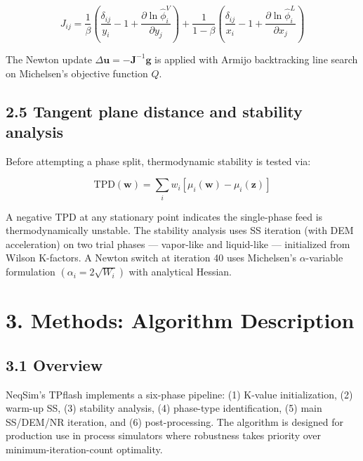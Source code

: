 \documentclass[review,3p]{custom}
\begin{document}
\begin{equation}

J_{ij} = \frac{1}{\beta}\left(\frac{\delta_{ij}}{y_i} - 1 + \frac{\partial \ln\hat\phi_i^V}{\partial y_j}\right) + \frac{1}{1-\beta}\left(\frac{\delta_{ij}}{x_i} - 1 + \frac{\partial \ln\hat\phi_i^L}{\partial x_j}\right)

\end{equation}

The Newton update $\Delta\mathbf{u} = -\mathbf{J}^{-1}\mathbf{g}$ is applied with
Armijo backtracking line search on Michelsen's objective function $Q$.

\subsection{2.5 Tangent plane distance and stability analysis}

Before attempting a phase split, thermodynamic stability is tested via:

\begin{equation}

\mathrm{TPD}(\mathbf{w}) = \sum_i w_i \left[\mu_i(\mathbf{w}) - \mu_i(\mathbf{z})\right]

\end{equation}

A negative TPD at any stationary point indicates the single-phase feed is
thermodynamically unstable. The stability analysis uses SS iteration (with DEM
acceleration) on two trial phases — vapor-like and liquid-like — initialized from
Wilson K-factors. A Newton switch at iteration 40 uses Michelsen's $\alpha$-variable
formulation $(\alpha_i = 2\sqrt{W_i})$ with analytical Hessian.


\section{3. Methods: Algorithm Description}



\subsection{3.1 Overview}

NeqSim's TPflash implements a six-phase pipeline: (1) K-value initialization,
(2) warm-up SS, (3) stability analysis, (4) phase-type identification, (5) main
SS/DEM/NR iteration, and (6) post-processing. The algorithm is designed for
production use in process simulators where robustness takes priority over
minimum-iteration-count optimality.
\end{document}
